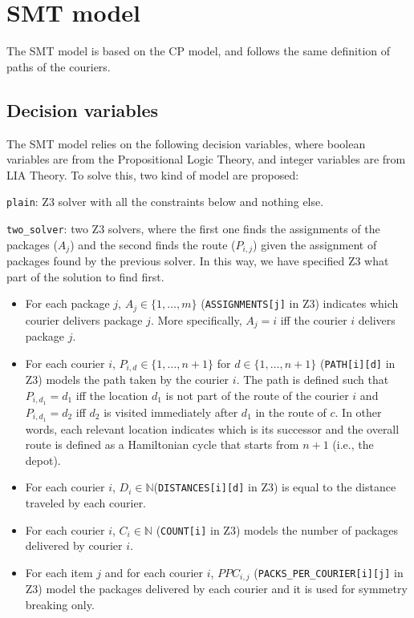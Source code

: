 \section{SMT model}

The SMT model is based on the CP model, and follows the same definition of paths of the couriers. 

\subsection{Decision variables}

The SMT model relies on the following decision variables, where boolean variables are from the Propositional Logic Theory, and integer variables are from LIA Theory. To solve this, two kind of model are proposed:

\item \texttt{plain}: Z3 solver with all the constraints below and nothing else.
\item \texttt{two_solver}: two Z3 solvers, where the first one finds the assignments of the packages ($A_j$) and the second finds the route ($P_{i,j}$) given the assignment of packages found by the previous solver. In this way, we have specified Z3 what part of the solution to find first. 

\begin{itemize}
    \item For each package $j$, $A_j \in \{1, \dots, m\}$ (\texttt{ASSIGNMENTS[j]} in Z3) indicates which courier delivers package $j$. More specifically, $A_j = i$ iff the courier $i$ delivers package $j$.
    
    \item For each courier $i$, $P_{i,d} \in \{1, \dots, n + 1\}$ for $d \in \{1, \dots, n + 1\}$ (\texttt{PATH[i][d]} in Z3) models the path taken by the courier $i$. The path is defined such that $P_{i, d_1} = d_1$ iff the location $d_1$ is not part of the route of the courier $i$ and $P_{i, d_1} = d_2$ iff $d_2$ is visited immediately after $d_1$ in the route of $c$. In other words, each relevant location indicates which is its successor and the overall route is defined as a Hamiltonian cycle that starts from $n+1$ (i.e., the depot).

    \item For each courier $i$, $D_i \in \mathbb{N}$(\texttt{DISTANCES[i][d]} in Z3) is equal to the distance traveled by each courier.

    \item For each courier $i$, $C_i \in \mathbb{N}$ (\texttt{COUNT[i]} in Z3) models the number of packages delivered by courier $i$.

    \item For each item $j$ and for each courier $i$, $PPC_{i,j}$ (\texttt{PACKS_PER_COURIER[i][j]} in Z3) model the packages delivered by each courier and it is used for symmetry breaking only.
\end{itemize}

